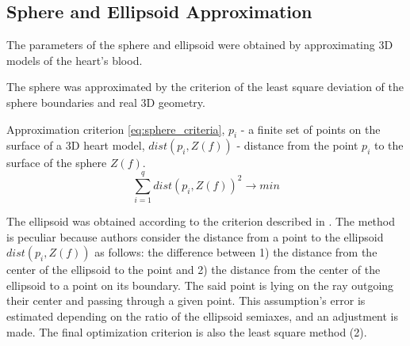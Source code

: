 \documentclass[conference]{IEEEtran}
\begin{document}
\subsection{Sphere and Ellipsoid Approximation}
The parameters of the sphere and ellipsoid were obtained by approximating 3D models of the heart's blood.

The sphere was approximated by the criterion of the least square deviation of the sphere boundaries and real 3D geometry.

Approximation criterion \ref{eq:sphere_criteria},
$p_i$ - a finite set of points on the surface of a 3D heart model,
$dist(p_i,Z(f))$ -  distance from the point $p_i$ to the surface of the sphere $Z(f)$. 
\begin{equation}
    \sum_{i=1}^{q}dist(p_i,Z(f))^2 \rightarrow min
    \label{eq:sphere_criteria}
\end{equation}

The ellipsoid was obtained according to the criterion described in . 
The method is peculiar because authors consider the distance from a point to the
ellipsoid $dist(p_i, Z(f))$ as follows: the difference between 1) the
distance from the center of the ellipsoid to the point and 2) the distance from
the center of the ellipsoid to a point on its boundary. The said point is lying
on the ray outgoing their center and passing through a given point. This
assumption's error is estimated depending on the ratio of the ellipsoid
semiaxes, and an adjustment is made. The final optimization criterion is also
the least square method (2). 
\end{document}
